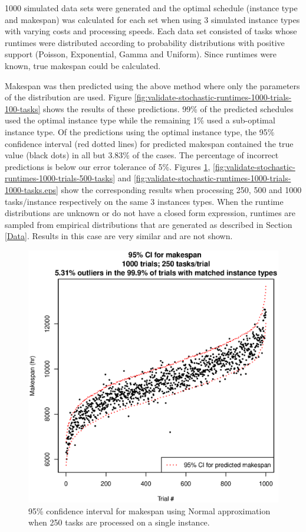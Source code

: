 \documentclass[12pt]{report}
\begin{document}
1000 simulated data sets were generated and the optimal schedule (instance type and makespan) was calculated for each set when using 3 simulated instance types with varying costs and processing speeds.
Each data set consisted of tasks whose runtimes were distributed according to probability distributions with positive support (Poisson, Exponential, Gamma and Uniform).
Since runtimes were known, true makespan could be calculated.


Makespan was then predicted using the above method where only the parameters of the distribution are used.
Figure \ref{fig:validate-stochastic-runtimes-1000-trials-100-tasks} shows the results of these predictions.
99\% of the predicted schedules used the optimal instance type while the remaining 1\% used a sub-optimal instance type.
Of the predictions using the optimal instance type, the 95\% confidence interval (red dotted lines) for predicted makespan contained the true value (black dots) in all but 3.83\% of the cases.
The percentage of incorrect predictions is below our error tolerance of 5\%.
Figures \ref{fig:validate-stochastic-runtimes-1000-trials-250-tasks}, \ref{fig:validate-stochastic-runtimes-1000-trials-500-tasks} and \ref{fig:validate-stochastic-runtimes-1000-trials-1000-tasks.eps} show the corresponding results when processing 250, 500 and 1000 tasks/instance respectively on the same 3 instances types. 
When the runtime distributions are unknown or do not have a closed form expression, runtimes are sampled from empirical distributions that are generated as described in Section \ref{Data}. Results in this case are very similar and are not shown.

\begin{figure}
\includegraphics[width=1\textwidth]{validate-stochastic-runtimes-1000-trials-250-tasks.eps}
\caption{95\% confidence interval for makespan using Normal approximation when 250 tasks are processed on a single instance.}
\label{fig:validate-stochastic-runtimes-1000-trials-250-tasks}
\end{figure}
\end{document}

